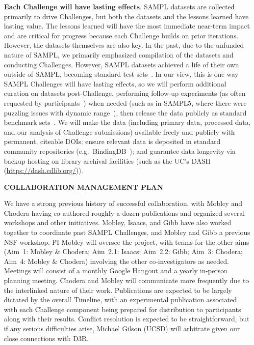 \documentclass[11pt]{article}
\begin{document}
\textbf{Each Challenge will have lasting effects}.
SAMPL datasets are collected primarily to drive Challenges, but both the datasets and the lessons learned have lasting value.
The lessons learned will have the most immediate near-term impact and are critical for progress because each Challenge builds on prior iterations. 
However, the datasets themselves are also key.
In the past, due to the unfunded nature of SAMPL, we primarily emphasized compilation of the datasets and conducting Challenges. 
However, SAMPL datasets achieved a life of their own outside of SAMPL, becoming standard test sets~\cite{Mobley:2014:JComputAidedMolDes, DuarteRamosMatos:2017:J.Chem.Eng.Data, Mobley:2017:AnnualReviewofBiophysics, Yang:2017:arXiv:1705.10035[q-bio], Gosink:2017:J.Phys.Chem.B}.
In our view, this is one way SAMPL Challenges will have lasting effects, so we will perform additional curation on datasets post-Challenge, performing follow-up experiments (as often requested by participants~\cite{Mobley:2017:eScholarship}) when needed (such as in SAMPL5, where there were puzzling issues with dynamic range~\cite{rustenburg_measuring_2016, Bannan:2016:JComputAidedMolDes}), then release the data publicly as standard benchmark sets~\cite{Mobley:2017:AnnualReviewofBiophysics}.
We will make the data (including primary data, processed data, and our analysis of Challenge submissions) available freely and publicly with permanent, citeable DOIs; ensure relevant data is deposited in standard community repositories (e.g.~BindingDB~\cite{Liu:2007:Nucl.AcidsRes.}); and guarantee data longevity via backup hosting on library archival facilities (such as the UC's DASH (\url{https://dash.cdlib.org/})).




{\Large \bf COLLABORATION MANAGEMENT PLAN}

We have a strong previous history of successful collaboration, with Mobley and Chodera having co-authored roughly a dozen publications and organized several workshops and other initiatives.
Mobley, Isaacs, and Gibb have also worked together to coordinate past SAMPL Challenges, and Mobley and Gibb a previous NSF workshop. 
PI Mobley will oversee the project, with teams for the other aims (Aim~1: Mobley \& Chodera; Aim~2.1: Isaacs; Aim~2.2: Gibb; Aim~3: Chodera; Aim~4: Mobley \& Chodera) involving the other co-investigators as needed.
Meetings will consist of a monthly Google Hangout and a yearly in-person planning meeting. 
Chodera and Mobley will communicate more frequently due to the interlinked nature of their work.
Publications are expected to be largely dictated by the overall Timeline, with an experimental publication associated with each Challenge component being prepared for distribution to participants along with their results.
Conflict resolution is expected to be straightforward, but if any serious difficulties arise, Michael Gilson (UCSD) will arbitrate given our close connections with D3R.
\end{document}
